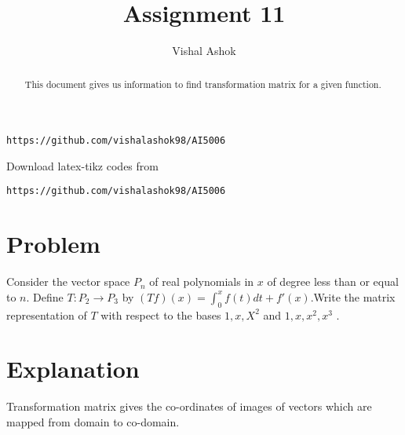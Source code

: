 \documentclass[journal,12pt,twocolumn]{IEEEtran}
\begin{document}
\makeatletter
{}
\makeatother
\let\StandardTheFigure\thefigure
\let\vec\mathbf
\renewcommand{\thefigure}{\theproblem}
\def\putbox#1#2#3{\makebox[0in][l]{\makebox[#1][l]{}\raisebox{\baselineskip}[0in][0in]{\raisebox{#2}[0in][0in]{#3}}}}
     \def\rightbox#1{\makebox[0in][r]{#1}}
     \def\centbox#1{\makebox[0in]{#1}}
     \def\topbox#1{\raisebox{-\baselineskip}[0in][0in]{#1}}
     \def\midbox#1{\raisebox{-0.5\baselineskip}[0in][0in]{#1}}
\vspace{3cm}
\title{Assignment 11}
\author{Vishal Ashok}
\maketitle
\newpage
\bigskip
\renewcommand{\thefigure}{\theenumi}
\renewcommand{\thetable}{\theenumi}
\begin{abstract}
This document gives us information to find transformation matrix for a given function.
\end{abstract}

%
\begin{lstlisting}
https://github.com/vishalashok98/AI5006\end{lstlisting}
%
Download latex-tikz codes from 
%
\begin{lstlisting}
https://github.com/vishalashok98/AI5006\end{lstlisting}
%
\section{Problem}
Consider the vector space $P_n$ of real polynomials in $x$ of degree less than or equal to $n$. Define $T:P_2 \rightarrow P_3$ by $(Tf)(x)=\int_{0}^{x}f(t)dt+f'(x)$.Write the matrix representation of $T$ with respect to the bases ${1,x,X^2}$ and ${1,x,x^2,x^3}$ .


\section{Explanation}

Transformation matrix gives the co-ordinates of images of vectors which are mapped from domain to co-domain. 
\end{document}
